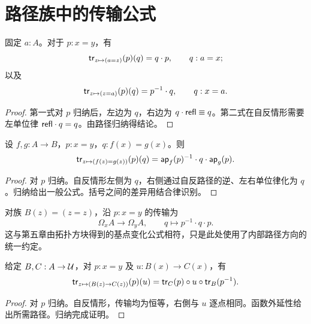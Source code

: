 \section{路径族中的传输公式}
\begin{proposition}[端点变化]
固定 $a:A$。对于 $p:x=y$，有
\[
\mathsf{tr}_{z\mapsto(a=z)}(p)(q)=q\cdot p,
\qquad q:a=x;
\]
以及
\[
\mathsf{tr}_{z\mapsto(z=a)}(p)(q)=p^{-1}\cdot q,
\qquad q:x=a.
\]
\end{proposition}
\begin{proof}
第一式对 $p$ 归纳后，左边为 $q$，右边为 $q\cdot\mathsf{refl}\equiv q$。第二式在自反情形需要左单位律 $\mathsf{refl}\cdot q=q$。由路径归纳得结论。
\end{proof}
\begin{proposition}[同时变化两个端点]\label{prop:transport-equality}
设 $f,g:A\to B$，$p:x=y$，$q:f(x)=g(x)$。则
\[
\mathsf{tr}_{z\mapsto(f(z)=g(z))}(p)(q)
=\mathsf{ap}_f(p)^{-1}\cdot q\cdot\mathsf{ap}_g(p).
\]
\end{proposition}
\begin{proof}
对 $p$ 归纳。自反情形左侧为 $q$，右侧通过自反路径的逆、左右单位律化为 $q$。归纳给出一般公式。括号之间的差异用结合律识别。
\end{proof}
\begin{example}[环路族的共轭]
对族 $B(z)=(z=z)$，沿 $p:x=y$ 的传输为
\[
\Omega_xA\to\Omega_yA,
\qquad q\mapsto p^{-1}\cdot q\cdot p.
\]
这与第五章由拓扑方块得到的基点变化公式相符，只是此处使用了内部路径方向的统一约定。
\end{example}
\begin{proposition}[函数族中的传输]
给定 $B,C:A\to\mathcal U$，对 $p:x=y$ 及 $u:B(x)\to C(x)$，有
\[
\mathsf{tr}_{z\mapsto(B(z)\to C(z))}(p)(u)
=\mathsf{tr}_C(p)\circ u\circ\mathsf{tr}_B(p^{-1}).
\]
\end{proposition}
\begin{proof}
对 $p$ 归纳。自反情形，传输均为恒等，右側与 $u$ 逐点相同。函数外延性给出所需路径。归纳完成证明。
\end{proof}

